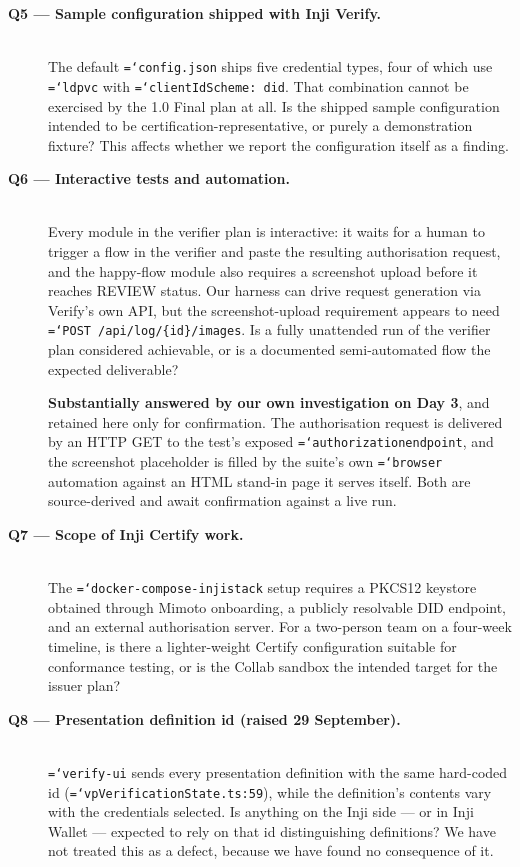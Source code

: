 \documentclass[11pt,a4paper]{article}
\let\origtexttt\texttt
\renewcommand{\texttt}[1]{\origtexttt{\hyphenchar\font=`\-\relax #1}}
\renewcommand{\_}{\textunderscore\allowbreak}
\begin{document}
\begin{description}
\item[\textbf{Q5 --- Sample configuration shipped with Inji Verify.}]\mbox{}\\
The default \texttt{config.json} ships five credential types, four of which use
\texttt{ldp\_vc} with \texttt{clientIdScheme: did}. That combination cannot be exercised by
the 1.0 Final plan at all. Is the shipped sample configuration intended to be
certification-representative, or purely a demonstration fixture? This affects whether we
report the configuration itself as a finding.

\item[\textbf{Q6 --- Interactive tests and automation.}]\mbox{}\\
Every module in the verifier plan is interactive: it waits for a human to trigger a flow in
the verifier and paste the resulting authorisation request, and the happy-flow module also
requires a screenshot upload before it reaches REVIEW status. Our harness can drive request
generation via Verify's own API, but the screenshot-upload requirement appears to need
\texttt{POST /api/log/\{id\}/images}. Is a fully unattended run of the verifier plan
considered achievable, or is a documented semi-automated flow the expected deliverable?

\textbf{Substantially answered by our own investigation on Day 3}, and retained here only
for confirmation. The authorisation request is delivered by an HTTP GET to the test's exposed
\texttt{authorization\_endpoint}, and the screenshot placeholder is filled by the suite's own
\texttt{browser} automation against an HTML stand-in page it serves itself. Both are
source-derived and await confirmation against a live run.

\item[\textbf{Q7 --- Scope of Inji Certify work.}]\mbox{}\\
The \texttt{docker-compose-injistack} setup requires a PKCS12 keystore obtained through
Mimoto onboarding, a publicly resolvable DID endpoint, and an external authorisation server.
For a two-person team on a four-week timeline, is there a lighter-weight Certify
configuration suitable for conformance testing, or is the Collab sandbox the intended target
for the issuer plan?

\item[\textbf{Q8 --- Presentation definition id (raised 29 September).}]\mbox{}\\
\texttt{verify-ui} sends every presentation definition with the same hard-coded id
(\texttt{vpVerificationState.ts:59}), while the definition's contents vary with the credentials
selected. Is anything on the Inji side --- or in Inji Wallet --- expected to rely on that id
distinguishing definitions? We have not treated this as a defect, because we have found no
consequence of it.

\end{description}
\end{document}
